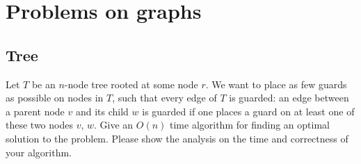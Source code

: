 \chapter{Problems on graphs}

\section{Tree}
\begin{Exercise}
Let $T$ be an $n$-node tree rooted at some node $r$. We want to place as few guards as possible on nodes in $T$, such that every edge of $T$ is guarded: an edge between a parent node $v$ and its child $w$ is guarded if one places a guard on at least one of these two nodes $v$, $w$. Give an $O(n)$ time algorithm for finding an optimal solution to the problem. Please show the analysis on the time and correctness of your algorithm.
\end{Exercise}
\begin{Answer}
\end{Answer}


